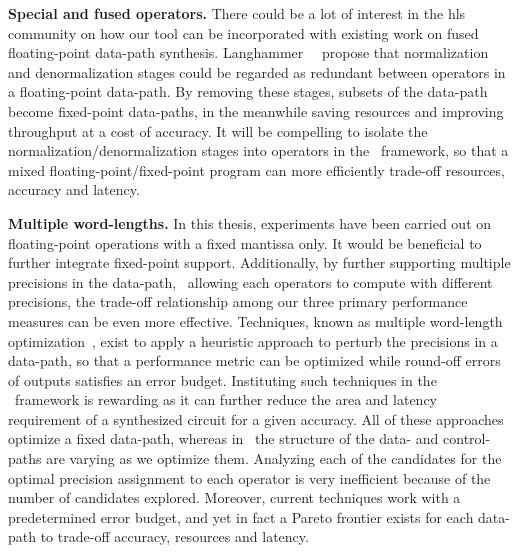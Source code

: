 \textbf{Special and fused operators.} There could be a lot of interest in the
\gls{hls} community on how our tool can be incorporated with existing work on
fused floating-point data-path synthesis.  Langhammer~\etal~\cite{langhammer}
propose that normalization and denormalization stages could be regarded as
redundant between operators in a floating-point data-path.  By removing
these stages, subsets of the data-path become fixed-point data-paths, in the
meanwhile saving resources and improving throughput at a cost of accuracy.  It
will be compelling to isolate the normalization/denormalization stages into
operators in the \soap~framework, so that a mixed floating-point/fixed-point
program can more efficiently trade-off resources, accuracy and latency.

\textbf{Multiple word-lengths.}  In this thesis, experiments have been carried
out on floating-point operations with a fixed mantissa only.  It would be
beneficial to further integrate fixed-point support.  Additionally, by further
supporting multiple precisions in the data-path, \ie~allowing each operators to
compute with different precisions, the trade-off relationship among our three
primary performance measures can be even more effective.  Techniques, known
as multiple word-length optimization~\cite{constantinides, lee06, cantin02},
exist to apply a heuristic approach to perturb the precisions in a data-path,
so that a performance metric can be optimized while round-off errors of outputs
satisfies an error budget.  Instituting such techniques in the \soap~framework
is rewarding as it can further reduce the area and latency requirement of a
synthesized circuit for a given accuracy.  All of these approaches optimize a
fixed data-path, whereas in \soap~the structure of the data- and control-paths
are varying as we optimize them.  Analyzing each of the candidates for the
optimal precision assignment to each operator is very inefficient because of
the number of candidates explored.  Moreover, current techniques work with a
predetermined error budget, and yet in fact a Pareto frontier exists for each
data-path to trade-off accuracy, resources and latency.

